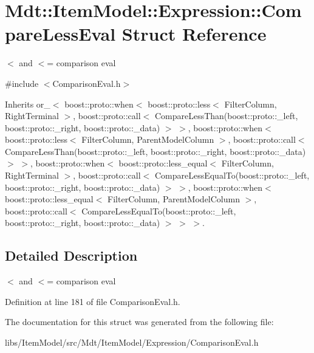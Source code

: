\hypertarget{struct_mdt_1_1_item_model_1_1_expression_1_1_compare_less_eval}{}\section{Mdt\+:\+:Item\+Model\+:\+:Expression\+:\+:Compare\+Less\+Eval Struct Reference}
\label{struct_mdt_1_1_item_model_1_1_expression_1_1_compare_less_eval}


$<$ and $<$= comparison eval  




{\ttfamily \#include $<$Comparison\+Eval.\+h$>$}



Inherits or\+\_\+$<$ boost\+::proto\+::when$<$ boost\+::proto\+::less$<$ Filter\+Column, Right\+Terminal $>$, boost\+::proto\+::call$<$ Compare\+Less\+Than(boost\+::proto\+::\+\_\+left, boost\+::proto\+::\+\_\+right, boost\+::proto\+::\+\_\+data) $>$ $>$, boost\+::proto\+::when$<$ boost\+::proto\+::less$<$ Filter\+Column, Parent\+Model\+Column $>$, boost\+::proto\+::call$<$ Compare\+Less\+Than(boost\+::proto\+::\+\_\+left, boost\+::proto\+::\+\_\+right, boost\+::proto\+::\+\_\+data) $>$ $>$, boost\+::proto\+::when$<$ boost\+::proto\+::less\+\_\+equal$<$ Filter\+Column, Right\+Terminal $>$, boost\+::proto\+::call$<$ Compare\+Less\+Equal\+To(boost\+::proto\+::\+\_\+left, boost\+::proto\+::\+\_\+right, boost\+::proto\+::\+\_\+data) $>$ $>$, boost\+::proto\+::when$<$ boost\+::proto\+::less\+\_\+equal$<$ Filter\+Column, Parent\+Model\+Column $>$, boost\+::proto\+::call$<$ Compare\+Less\+Equal\+To(boost\+::proto\+::\+\_\+left, boost\+::proto\+::\+\_\+right, boost\+::proto\+::\+\_\+data) $>$ $>$ $>$.



\subsection{Detailed Description}
$<$ and $<$= comparison eval 

Definition at line 181 of file Comparison\+Eval.\+h.



The documentation for this struct was generated from the following file\+:\begin{DoxyCompactItemize}
\item 
libs/\+Item\+Model/src/\+Mdt/\+Item\+Model/\+Expression/Comparison\+Eval.\+h\end{DoxyCompactItemize}

